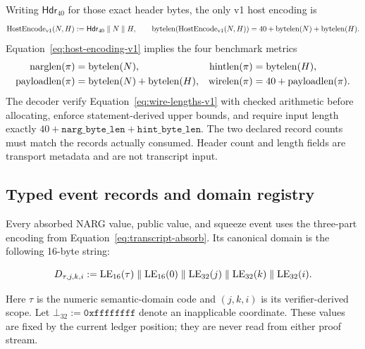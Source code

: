 Writing $\mathsf{Hdr}_{40}$ for those exact header bytes, the only v1 host
encoding is
\begin{equation}
 \operatorname{HostEncode}_{\rm v1}(N,H)
 :=\mathsf{Hdr}_{40}\parallel N\parallel H,
 \qquad
 \operatorname{bytelen}(\operatorname{HostEncode}_{\rm v1}(N,H))=40+\operatorname{bytelen}(N)+\operatorname{bytelen}(H).
 \label{eq:host-encoding-v1}
\end{equation}
Equation~\eqref{eq:host-encoding-v1} implies the four benchmark metrics
\begin{equation}
 \begin{aligned}
  \operatorname{narglen}(\pi)&=\operatorname{bytelen}(N),&
  \operatorname{hintlen}(\pi)&=\operatorname{bytelen}(H),\\
  \operatorname{payloadlen}(\pi)&=\operatorname{bytelen}(N)+\operatorname{bytelen}(H),&
  \operatorname{wirelen}(\pi)&=40+\operatorname{payloadlen}(\pi).
 \end{aligned}
 \label{eq:wire-lengths-v1}
\end{equation}
The decoder \must{} verify Equation~\eqref{eq:wire-lengths-v1} with checked
arithmetic before allocating, enforce statement-derived upper bounds, and
require input length exactly $40+\mathtt{narg\_byte\_len}+
\mathtt{hint\_byte\_len}$.  The two declared record counts must match the
records actually consumed.  Header count and length fields are transport
metadata and are not transcript input.

\subsection{Typed event records and domain registry}
\label{sec:wire-events}

Every absorbed NARG value, public value, and squeeze event uses the three-part
encoding from Equation~\eqref{eq:transcript-absorb}.  Its canonical domain is
the following 16-byte string:

\begin{equation}
 D_{\tau,j,k,i}:=
 \operatorname{LE}_{16}(\tau)\parallel\operatorname{LE}_{16}(0)\parallel
 \operatorname{LE}_{32}(j)\parallel\operatorname{LE}_{32}(k)\parallel\operatorname{LE}_{32}(i).
 \label{eq:event-domain-v1}
\end{equation}

Here $\tau$ is the numeric semantic-domain code and $(j,k,i)$ is its
verifier-derived scope.  Let $\bot_{32}:=\mathtt{0xffffffff}$ denote an
inapplicable coordinate.  These values are fixed by the current ledger
position; they are never read from either proof stream.

